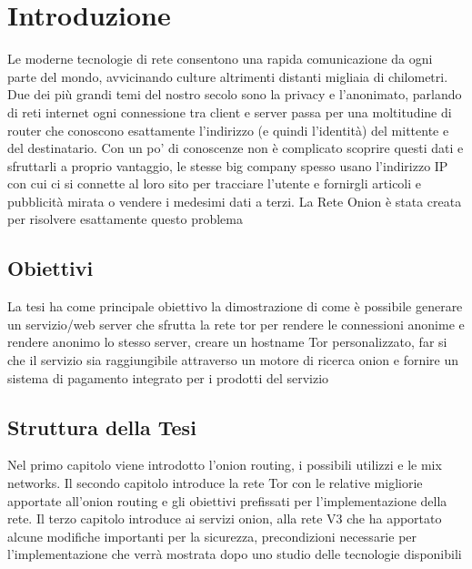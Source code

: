 \chapter{Introduzione}
\label{chap:intro}

Le moderne tecnologie di rete consentono una rapida comunicazione da ogni parte del mondo, avvicinando culture altrimenti distanti migliaia di chilometri. Due dei più grandi temi del nostro secolo sono la privacy e l'anonimato, parlando di reti internet ogni connessione tra client e server passa per una moltitudine di router che conoscono esattamente l'indirizzo (e quindi l'identità) del mittente e del destinatario. Con un po' di conoscenze non è complicato scoprire questi dati e sfruttarli a proprio vantaggio, le stesse big company spesso usano l'indirizzo IP con cui ci si connette al loro sito per tracciare l'utente e fornirgli articoli e pubblicità mirata o vendere i medesimi dati a terzi. 
La Rete Onion è stata creata per risolvere esattamente questo problema

\section{Obiettivi}

La tesi ha come principale obiettivo la dimostrazione di come è possibile generare un servizio/web server che sfrutta la rete tor per rendere le connessioni anonime e rendere anonimo lo stesso server, creare un hostname Tor personalizzato, far si che il servizio sia raggiungibile attraverso un motore di ricerca onion e fornire un sistema di pagamento integrato per i prodotti del servizio

\section{Struttura della Tesi}
Nel primo capitolo viene introdotto l'onion routing, i possibili utilizzi e le mix networks. 
Il secondo capitolo introduce la rete Tor con le relative migliorie apportate all'onion routing e gli obiettivi prefissati per l'implementazione della rete.
Il terzo capitolo introduce ai servizi onion, alla rete V3 che ha apportato alcune modifiche importanti per la sicurezza, precondizioni necessarie per l'implementazione che verrà mostrata dopo uno studio delle tecnologie disponibili
